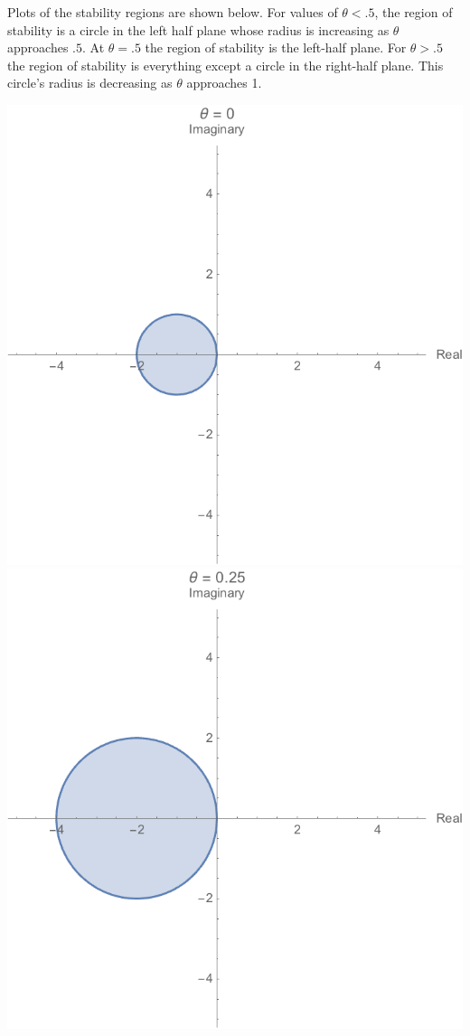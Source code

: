 \documentclass[11pt, oneside, titlepage]{article}
\begin{document}
\begin{enumerate}
\begin{enumerate}
                Plots of the stability regions are shown below.
                For values of $\theta < .5$, the region of stability is a circle
                in the left half plane whose radius is increasing as $\theta$ approaches
                $.5$.
                At $\theta = .5$ the region of stability is the left-half plane.
                For $\theta > .5$ the region of stability is everything
                except a circle in the right-half plane.
                This circle's radius is decreasing as $\theta$ approaches 1.
                \begin{center}
                   \includegraphics[scale=.3]{Figures/04_3_1.png}
                   \includegraphics[scale=.3]{Figures/04_3_2.png}

\end{center}
\end{enumerate}
\end{enumerate}
\end{document}
